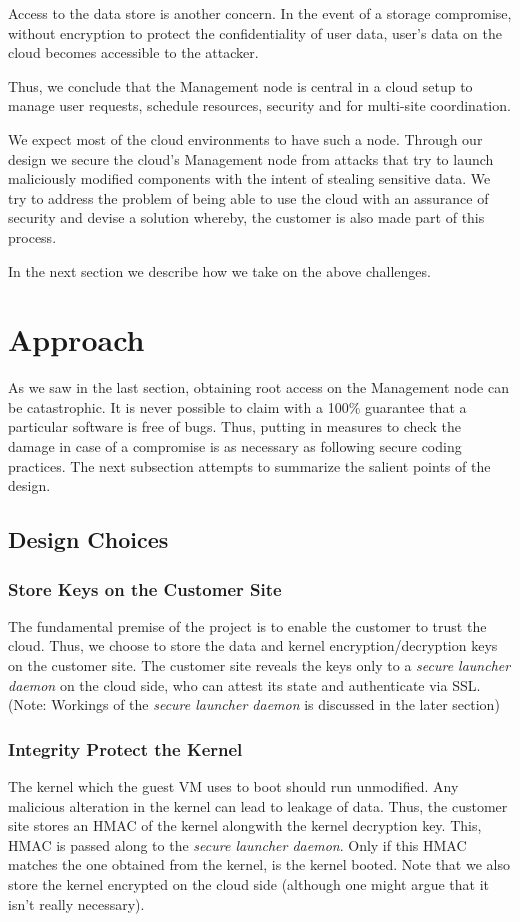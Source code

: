 \documentclass[10pt,twocolumn,pdftex]{article}
\begin{document}
Access to the data store is another concern. In the event of a storage compromise, without encryption to protect the confidentiality of user data, user's data on the cloud becomes accessible to the attacker.

Thus, we conclude that the Management node is central in a cloud setup to manage user requests, schedule resources, security and for multi-site coordination.

We expect most of the cloud environments to have such a node. Through our design we secure the cloud's Management node from attacks that try to launch maliciously modified components with the intent of stealing sensitive data. We try to address the problem of being able to use the cloud with an assurance of security and devise a solution whereby, the customer is also made part of this process.

In the next section we describe how we take on the above challenges.

\section{Approach}
\label{sec:approach}
As we saw in the last section, obtaining root access on the Management node can be catastrophic. It is never possible to claim with a 100\% guarantee that a particular software is free of bugs. Thus, putting in measures to check the damage in case of a compromise is as necessary as following secure coding practices. The next subsection attempts to summarize the salient points of the design. 

\subsection{Design Choices}

\subsubsection{Store Keys on the Customer Site}
The fundamental premise of the project is to enable the customer to trust the cloud. Thus, we choose to store the data and kernel encryption/decryption keys on the customer site. The customer site reveals the keys only to a \emph{secure launcher daemon} on the cloud side, who can attest its state and authenticate via SSL. (Note: Workings of the \emph{secure launcher daemon} is discussed in the later section)

\subsubsection{Integrity Protect the Kernel}
The kernel which the guest VM uses to boot should run unmodified. Any malicious alteration in the kernel can lead to leakage of data. Thus, the customer site stores an HMAC of the kernel alongwith the kernel decryption key. This, HMAC is passed along to the \emph{secure launcher daemon}. Only if this HMAC matches the one obtained from the kernel, is the kernel booted. Note that we also store the kernel encrypted on the cloud side (although one might argue that it isn't really necessary).
\end{document}
